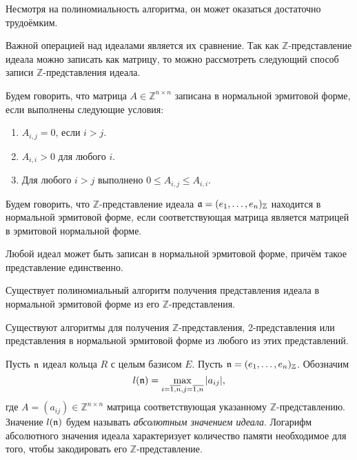 \documentclass[_00_dissertation.tex]{subfiles}
\begin{document}
\begin{remark}
    Несмотря на полиномиальность алгоритма, он может оказаться достаточно трудоёмким.
\end{remark}

Важной операцией над идеалами является их сравнение.
Так как $\mathbb{Z}$-представление идеала можно записать как матрицу, то можно рассмотреть следующий способ записи $\mathbb{Z}$-представления идеала.

\begin{definition}
    Будем говорить, что матрица $A \in \mathbb{Z}^{n \times n}$ записана в нормальной эрмитовой форме, если выполнены следующие условия:
    \begin{enumerate}
        \item $A_{i, j} = 0$, если $i > j$.
        
        \item $A_{i,i} > 0$ для любого $i$.
        
        \item Для любого $i > j$ выполнено $0 \leq A_{i, j} \leq A_{i, i}$.
    \end{enumerate}
\end{definition}

\begin{definition}
    Будем говорить, что $\mathbb{Z}$-представление идеала $\mathfrak{a} = (e_1,\dots,e_n)_{\mathbb{Z}}$ находится в нормальной эрмитовой форме, если соответствующая матрица является матрицей в эрмитовой нормальной форме.
\end{definition}

\begin{statement}\cite{Cohen, Post}
    Любой идеал может быть записан в нормальной эрмитовой форме, причём такое представление единственно.
\end{statement}

\begin{statement}\cite{PolynomialHermitForm}
    Существует полиномиальный алгоритм получения представления идеала в нормальной эрмитовой форме из его $\mathbb{Z}$-представления.
\end{statement}

\begin{corollary}
    Существуют алгоритмы для получения $\mathbb{Z}$-представления, 2-представления или представления в нормальной эрмитовой форме из любого из этих представлений.
\end{corollary}

\begin{definition}
    Пусть $\mathfrak{n}$ идеал кольца $R$ с целым базисом $E$.
    Пусть $\mathfrak{n} = (e_1, \dots, e_n)_{\mathbb{Z}}$.
    Обозначим
    \begin{equation*}
        l(\mathfrak{n}) = \max\limits_{i = \overline{1,n}, j = \overline{1,n}} |a_{ij}|, 
    \end{equation*}
    где $A = (a_{ij}) \in \mathbb{Z}^{n \times n}$ матрица соответствующая указанному $\mathbb{Z}$-представлению.
    Значение $l(\mathfrak{n})$ будем называть \emph{абсолютным значением идеала}.
    Логарифм абсолютного значения идеала характеризует количество памяти необходимое для того, чтобы закодировать его $\mathbb{Z}$-представление.
\end{definition}
\end{document}
